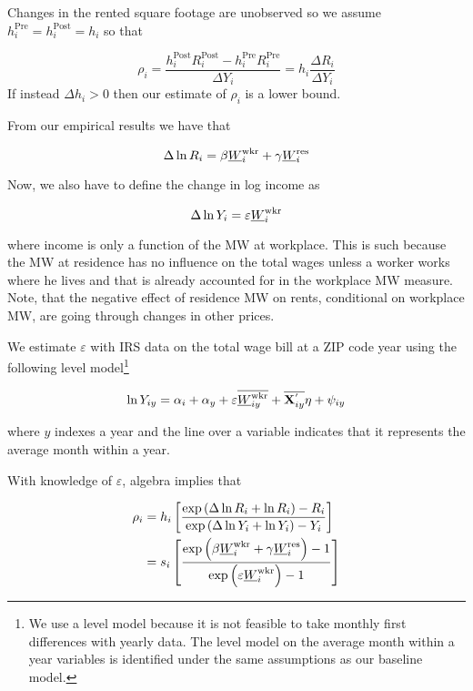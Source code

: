 Changes in the rented square footage are unobserved so we assume 
$h^{\text{Pre}}_i = h^{\text{Post}}_i = h_i$ so that

\begin{equation*}
	\rho_i = \frac{h^{\text{Post}}_i R^{\text{Post}}_i - h^{\text{Pre}}_i R^{\text{Pre}}_i}{\Delta Y_i} = 
	         h_i \frac{\Delta R_i}{\Delta Y_i}
\end{equation*}
If instead $\Delta h_i > 0$ then our estimate of $\rho_i$ is a lower bound.

From our empirical results we have that

\[
    \Delta \ln R_i = \beta \underline{W}_i^{\text{wkr}} + \gamma \underline{W}_i^{\text{res}}
\]

Now, we also have to define the change in log income as

\[
    \Delta \ln Y_i = \varepsilon \underline{W}_i^{\text{wkr}}
\]

where income is only a function of the MW at workplace. This is such because
the MW at residence has no influence on the total wages unless a worker works 
where he lives and that is already accounted for in the workplace MW measure. Note,
that the negative effect of residence MW on rents, conditional on workplace MW, are
going through changes in other prices. 

We estimate $\varepsilon$ with IRS data on the total wage bill at a ZIP code year using
the following level model\footnote{We use a level model because it is not feasible to 
take monthly first differences with yearly data. The level model on the average month 
within a year variables is identified under the same assumptions as our baseline model.}

\begin{equation}\label{eq:wage_level_model}
    \ln Y_{iy} = \alpha_i + \alpha_y + \varepsilon \overline{\underline{W}_{iy}^{\text{wkr}}} + 
                 \overline{\mathbf{X}^{'}_{iy}}\eta + \psi_{iy}
\end{equation}

where $y$ indexes a year and the line over a variable indicates that it represents 
the average month within a year.

With knowledge of $\varepsilon$, algebra implies that

\begin{equation}\label{eq:rho}
	\begin{split}
		\rho_i & = h_i \left[ 
		\frac{\exp \left(\Delta \ln R_i + \ln R_i \right) - R_i }{\exp \left( \Delta \ln Y_i + \ln Y_i \right) - Y_i }
		\right] \\
		& = s_i \left[
		\frac{\exp \left( \beta \underline{W}_i^{\text{wkr}} + \gamma \underline{W}_i^{\text{res}} \right) - 1 }{\exp \left( \varepsilon \underline{W}_i^{\text{wkr}} \right) - 1 }
		\right]
	\end{split}
\end{equation}

